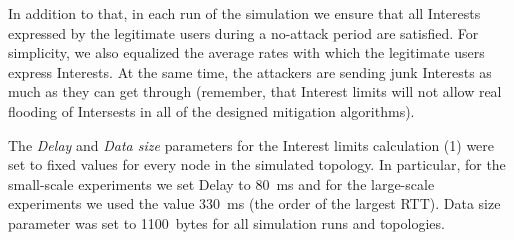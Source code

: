 In addition to that, in each run of the simulation we ensure that all Interests expressed by the legitimate users during a no-attack period are satisfied.
For simplicity, we also equalized the average rates with which the legitimate users express Interests.
At the same time, the attackers are sending junk Interests as much as they can get through (remember, that Interest limits will not allow real flooding of Intersests in all of the designed mitigation algorithms).

The \emph{Delay} and \emph{Data size} parameters for the Interest limits calculation (1) were set to fixed values for every node in the simulated topology.
In particular, for the small-scale experiments we set Delay to 80~ms and for the large-scale experiments we used the value 330~ms (the order of the largest RTT).
Data size parameter was set to 1100~bytes for all simulation runs and topologies.




% 

